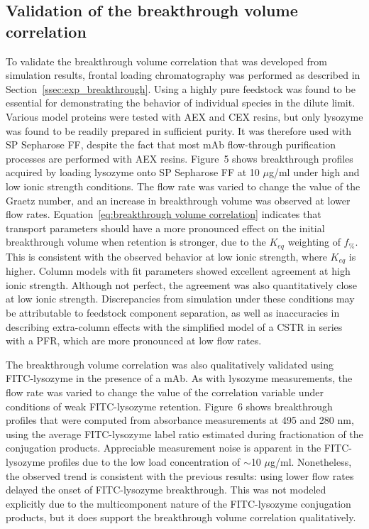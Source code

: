 \documentclass[preprint,review,12pt]{elsarticle}
\begin{document}
    \subsection{Validation of the breakthrough volume correlation} \label{ssec:validation}
        To validate the breakthrough volume correlation that was developed from simulation results, frontal loading chromatography was performed as described in Section~\ref{ssec:exp_breakthrough}. Using a highly pure feedstock was found to be essential for demonstrating the behavior of individual species in the dilute limit. Various model proteins were tested with AEX and CEX resins, but only lysozyme was found to be readily prepared in sufficient purity. It was therefore used with SP Sepharose FF, despite the fact that most mAb flow-through purification processes are performed with AEX resins. Figure~5 shows breakthrough profiles acquired by loading lysozyme onto SP Sepharose FF at 10 $\mu$g/ml under high and low ionic strength conditions. The flow rate was varied to change the value of the Graetz number, and an increase in breakthrough volume was observed at lower flow rates. Equation~\ref{eq:breakthrough volume correlation} indicates that transport parameters should have a more pronounced effect on the initial breakthrough volume when retention is stronger, due to the $K_{eq}$ weighting of $f_\%$. This is consistent with the observed behavior at low ionic strength, where $K_{eq}$ is higher. Column models with fit parameters showed excellent agreement at high ionic strength. Although not perfect, the agreement was also quantitatively close at low ionic strength. Discrepancies from simulation under these conditions may be attributable to feedstock component separation, as well as inaccuracies in describing extra-column effects with the simplified model of a CSTR in series with a PFR, which are more pronounced at low flow rates.

        The breakthrough volume correlation was also qualitatively validated using FITC-lysozyme in the presence of a mAb. As with lysozyme measurements, the flow rate was varied to change the value of the correlation variable under conditions of weak FITC-lysozyme retention. Figure~6 shows breakthrough profiles that were computed from absorbance measurements at 495 and 280 nm, using the average FITC-lysozyme label ratio estimated during fractionation of the conjugation products. Appreciable measurement noise is apparent in the FITC-lysozyme profiles due to the low load concentration of $\sim$10 $\mu$g/ml. Nonetheless, the observed trend is consistent with the previous results:  using lower flow rates delayed the onset of FITC-lysozyme breakthrough. This was not modeled explicitly due to the multicomponent nature of the FITC-lysozyme conjugation products, but it does support the breakthrough volume correlation qualitatively.
\end{document}
